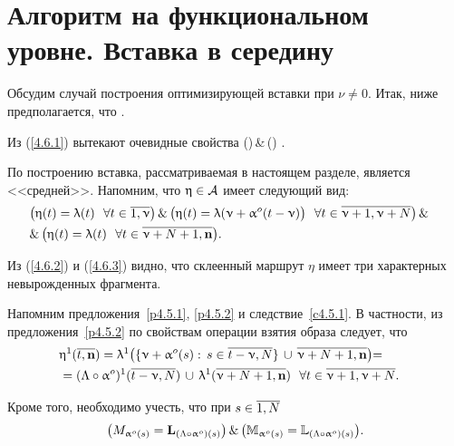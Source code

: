 
\section{
  Алгоритм на функциональном уровне.
  Вставка в середину
}
\label{sect:4.6}
\setcounter{equation}{0}

Обсудим случай построения оптимизирующей вставки при
$\nu \neq 0$.
Итак, ниже предполагается, что
\bfn
  \label{4.6.1}
  \nu\in {}
  .
\efn

Из (\ref{4.6.1}) вытекают очевидные свойства
\bfn
  \label{4.6.2}
  (\neq \emp)\,\&\,(\neq \emp)
  .
\efn

По построению вставка, рассматриваемая в настоящем разделе, является <<средней>>.
Напомним, что $\upeta\in {\cal A}$ имеет следующий вид:
\begin{eqnarray}
  &\bigl(\eta(t) = \la(t)\ \ \fa t\in \ov{1,\nu}\bigl)\,\&\,\bigl(\eta(t) =
  \la(\nu+ \al^o(t-\nu)\bigl)\ \ \fa t\in \ov{\nu+1,\nu+N}\bigl)\,\&
  &\nonumber\\
  &\&\,\bigl(\eta(t)= \la(t)\ \ \fa t\in \ov{\nu+N+1,\mathbf{n}}\bigl)
  .
  &
  \label{4.6.3}
\end{eqnarray}

Из (\ref{4.6.2}) и (\ref{4.6.3}) видно,
что склеенный маршрут $\eta$
имеет три характерных невырожденных фрагмента.

Напомним предложения~\ref{p4.5.1}, \ref{p4.5.2} и следствие~\ref{c4.5.1}.
В частности,
из предложения~\ref{p4.5.2}
по свойствам операции взятия образа следует, что
\begin{eqnarray}
  &\eta^1(\ov{t,\mathbf{n}}) = \la^1\bigl(\{\nu+\al^o(s):\,s\in \ov{t-\nu,N}\}\,\cup\,
  \ov{\nu+N+1,\nn}\bigl) =
  &\nonumber\\
  &= (\La \circ\al^o)^1(\ov{t-\nu,N})\,\cup\, \la^1(\ov{\nu+N+1,\nn})\ \ \fa t\in \ov{\nu+1,\nu+N}
  .
  &
  \label{4.6.3`}
\end{eqnarray}

Кроме того,
необходимо учесть,
что при
$s\in \ov{1,N}$
$$
  \bigl(M_{\upalpha^o(s)} = \mathbf{L}_{(\Lambda\circ \upalpha^o)(s)}\bigl)\,\&\,\bigl({\mathbb M}_{\upalpha^o(s)} =
  {\mathbb L}_{(\Lambda\circ \upalpha^o)(s)}\bigl)
  .
$$

